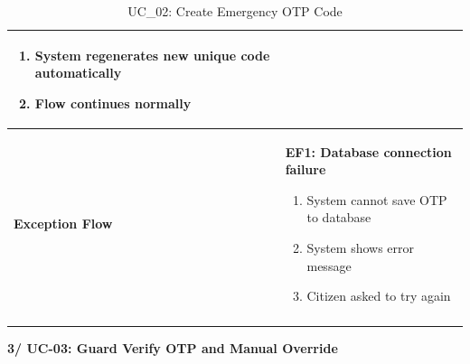 \documentclass[a4paper]{article}
\newlength{\ucLeft}
\begin{document}
\begin{longtable}{|>{\bfseries}p{\ucLeft}|
                p{\dimexpr\textwidth-\ucLeft-4\tabcolsep-3\arrayrulewidth\relax}|}
\begin{enumerate}
    \item System regenerates new unique code automatically
    \item Flow continues normally
\end{enumerate}
\\ \hline
Exception Flow &
\noindent \textbf{EF1: Database connection failure}
\begin{enumerate}
    \item System cannot save OTP to database
    \item System shows error message
    \item Citizen asked to try again
\end{enumerate}
\\ \hline
\caption{UC\_02: Create Emergency OTP Code}\label{tab:uc02}
\end{longtable}

\newpage
\noindent \textbf{3/ UC-03: Guard Verify OTP and Manual Override}
\setlength{\tabcolsep}{6pt}
\renewcommand{\arraystretch}{1.2}
\setlength{\ucLeft}{30mm}
\end{document}
